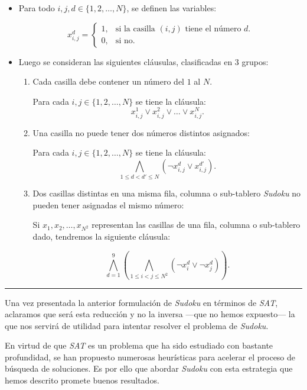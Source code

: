 \documentclass[12pt,lettersize,oneside]{article}
\begin{document}
\begin{itemize}
\item Para todo $i,j,d \in \{ 1,2,\ldots,N\}$, se definen las variables:

\[ x_{i,j}^d = \begin{cases} 1, & \mbox{si la casilla $(i,j)$ tiene el número
    $d$.} \\
    0, & \mbox{si no.} \end{cases}\]

\item Luego se consideran las siguientes cláusulas, clasificadas en 3 grupos:
\vspace{-2.5mm}

\begin{enumerate}
\item Cada casilla debe contener un número del $1$ al $N$.

     Para cada $i,j \in \{1,2,\ldots,N\}$ se tiene la cláusula:
       \[ x_{i,j}^1 \vee x_{i,j}^2 \vee \ldots \vee x_{i,j}^N.\]

\item Una casilla no puede tener dos números distintos asignados:

     Para cada $i,j \in \{1,2,\ldots,N\}$ se tiene la cláusula:
     \[ \bigwedge_{1\leq d < d' \leq N} (\neg x_{i,j}^d \vee x_{i,j}^{d'}).\]

\item Dos casillas distintas en una misma fila, columna o sub-tablero
  \emph{Sudoku} no pueden tener asignadas el mismo número:

     Si $x_1,x_2,\ldots, x_{N^2}$ representan las casillas de una fila, columna
     o sub-tablero dado, tendremos la siguiente cláusula:

     \[ \bigwedge_{d=1}^{9} \left( \bigwedge_{1\leq i < j \leq N^2}
       \left( \neg x_{i}^d \vee \neg x_{j}^{d} \right)\right).\]
\end{enumerate}

\end{itemize}
\rule{4cm}{0.3mm}

Una vez presentada la anterior formulación de \emph{Sudoku} en términos de
\emph{SAT}, aclaramos que será esta reducción y no la inversa ---que no hemos
expuesto--- la que nos servirá de utilidad para intentar resolver el problema de
\emph{Sudoku}.

En virtud de que \emph{SAT} es un problema que ha sido estudiado con bastante
profundidad, se han propuesto numerosas heurísticas para acelerar el proceso de
búsqueda de soluciones. Es por ello que abordar \emph{Sudoku} con esta
estrategia que hemos descrito promete buenos resultados.
\end{document}
